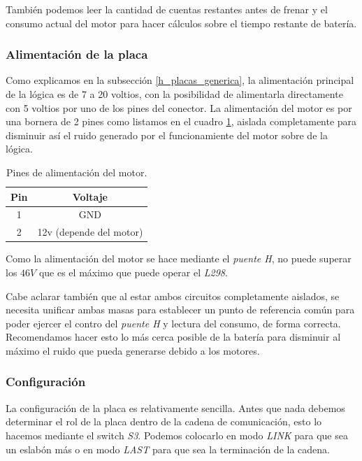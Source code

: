 Tambi\'en podemos leer la cantidad de cuentas restantes antes de frenar y el consumo actual del motor para
hacer c\'alculos sobre el tiempo restante de bater\'ia.

\subsubsection{Alimentaci\'on de la placa}
\label{h_placas_motorDC_alimentacion}

Como explicamos en la subsecci\'on \ref{h_placas_generica}, la alimentaci\'on principal de la l\'ogica es
de 7 a 20 voltios, con la posibilidad de alimentarla directamente con 5 voltios por uno de los pines del conector.
La alimentaci\'on del motor es por una bornera de 2 pines como listamos en el cuadro \ref{hT_placa_dc_alimentacion},
aislada completamente para disminuir as\'i el ruido generado por el funcionamiente del motor sobre de la l\'ogica.

\begin{table}
	\begin{center}
		\begin{tabular}{|c|c|}
			\hline
			Pin & Voltaje \\
			\hline
			1 & GND \\
			\hline
			2 & 12v (depende del motor) \\
			\hline
		\end{tabular}
		\caption{Pines de alimentaci\'on del motor.}
		\label{hT_placa_dc_alimentacion}
	\end{center}
\end{table}

Como la alimentaci\'on del motor se hace mediante el \emph{puente H}, no puede superar los $46V$ que es el
m\'aximo que puede operar el \emph{L298}.

Cabe aclarar tambi\'en que al estar ambos circuitos completamente aislados, se necesita unificar ambas masas
para establecer un punto de referencia com\'un para poder ejercer el contro del \emph{puente H} y lectura
del consumo, de forma correcta.
Recomendamos hacer esto lo m\'as cerca posible de la bater\'ia para disminuir al m\'aximo el ruido que pueda
generarse debido a los motores.

\subsubsection{Configuraci\'on}
\label{h_placas_motorDC_config}

La configuraci\'on de la placa es relativamente sencilla.
Antes que nada debemos determinar el rol de la placa dentro de la cadena de comunicaci\'on, esto lo hacemos
mediante el switch \emph{S3}.
Podemos colocarlo en modo \emph{LINK} para que sea un eslab\'on m\'as o en modo \emph{LAST} para que sea
la terminaci\'on de la cadena.

